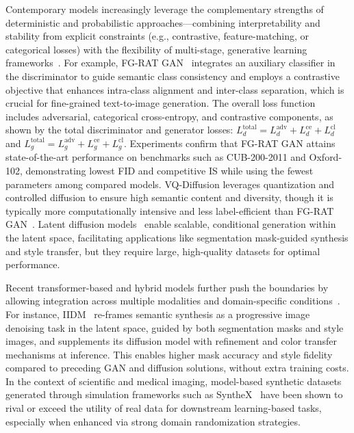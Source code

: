 \documentclass[sigconf]{acmart}
\begin{document}
Contemporary models increasingly leverage the complementary strengths of deterministic and probabilistic approaches—combining interpretability and stability from explicit constraints (e.g., contrastive, feature-matching, or categorical losses) with the flexibility of multi-stage, generative learning frameworks~\cite{ref87,ref90,ref101,ref102}. For example, FG-RAT GAN~\cite{ref101} integrates an auxiliary classifier in the discriminator to guide semantic class consistency and employs a contrastive objective that enhances intra-class alignment and inter-class separation, which is crucial for fine-grained text-to-image generation. The overall loss function includes adversarial, categorical cross-entropy, and contrastive components, as shown by the total discriminator and generator losses: $L_d^\text{total} = L_d^\text{adv} + L_d^\text{ce} + L_d^\text{cl}$ and $L_g^\text{total} = L_g^\text{adv} + L_g^\text{ce} + L_g^\text{cl}$. Experiments confirm that FG-RAT GAN attains state-of-the-art performance on benchmarks such as CUB-200-2011 and Oxford-102, demonstrating lowest FID and competitive IS while using the fewest parameters among compared models. VQ-Diffusion leverages quantization and controlled diffusion to ensure high semantic content and diversity, though it is typically more computationally intensive and less label-efficient than FG-RAT GAN~\cite{ref82,ref87,ref101}. Latent diffusion models~\cite{ref82,ref101,ref102} enable scalable, conditional generation within the latent space, facilitating applications like segmentation mask-guided synthesis and style transfer, but they require large, high-quality datasets for optimal performance.

Recent transformer-based and hybrid models further push the boundaries by allowing integration across multiple modalities and domain-specific conditions~\cite{ref64,ref81,ref102}. For instance, IIDM~\cite{ref102} re-frames semantic synthesis as a progressive image denoising task in the latent space, guided by both segmentation masks and style images, and supplements its diffusion model with refinement and color transfer mechanisms at inference. This enables higher mask accuracy and style fidelity compared to preceding GAN and diffusion solutions, without extra training costs. In the context of scientific and medical imaging, model-based synthetic datasets generated through simulation frameworks such as SyntheX~\cite{ref81} have been shown to rival or exceed the utility of real data for downstream learning-based tasks, especially when enhanced via strong domain randomization strategies.
\end{document}
